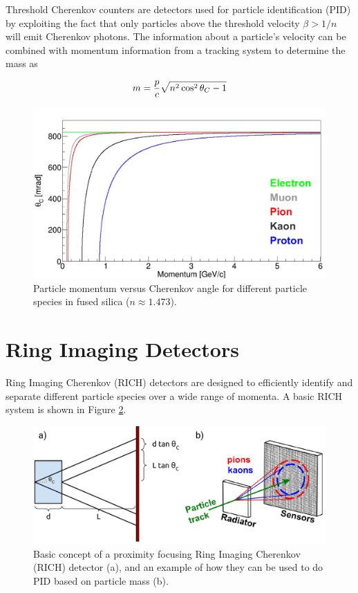 Threshold Cherenkov counters are detectors used for particle identification (PID) by exploiting the fact that only particles above the threshold velocity $\beta > 1/n$ will emit Cherenkov photons. The information about a particle's velocity can be combined with momentum information from a tracking system to determine the mass as \cite{ParticleDetectionHandbook}

\begin{equation}
	m = \frac{p}{c} \sqrt{n^2 \cos^2\theta_{C} - 1}
	\label{eq:mass}
\end{equation}

\begin{figure}[ht]
	\centering
	\includegraphics[scale=.8]{figures/angle_seperation_6.pdf}
	\caption{Particle momentum versus Cherenkov angle for different particle species in fused silica ($n \approx 1.473$).}
	\label{fig:angleseperation}
\end{figure}

\section{Ring Imaging Detectors}
Ring Imaging Cherenkov (RICH) detectors are designed to efficiently identify and separate different particle species over a wide range of momenta. A basic RICH system is shown in Figure \ref{fig:richbasics}. 

\begin{figure}[ht]
	\centering
	\includegraphics[width=\textwidth]{figures/RICH_rings.pdf}
	\caption{Basic concept of a proximity focusing Ring Imaging Cherenkov (RICH) detector (a), and an example of how they can be used to do PID based on particle mass (b).}
	\label{fig:richbasics}
\end{figure}

